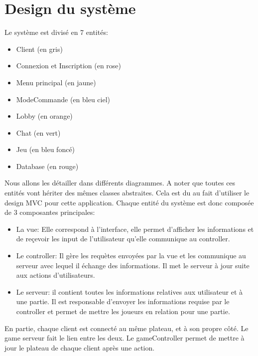 \documentclass[../design_fonctionnement_sys.tex]{subfiles}
\begin{document}
\section{Design du système}
Le système est divisé en 7 entités:
\begin{itemize}
    \item Client (en gris)
    \item Connexion et Inscription (en rose)
    \item Menu principal (en jaune)
    \item ModeCommande (en bleu ciel)
    \item Lobby (en orange)
    \item Chat (en vert)
    \item Jeu (en bleu foncé)
    \item Database (en rouge)
    \newline
\end{itemize}

Nous allons les détailler dans différents diagrammes. A noter que toutes ces entités vont hériter des mêmes classes abstraites.
Cela est du au fait d'utiliser le design MVC pour cette application.
Chaque entité du système est donc composée de 3 composantes principales:
\begin{itemize}
    \item La vue: Elle correspond à l'interface, elle permet d'afficher les informations 
    et de reçevoir les input de l'utilisateur qu'elle communique au controller.
    \item Le controller: Il gère les requètes envoyées par la vue et les communique au serveur avec lequel il échange des informations.
    Il met le serveur à jour suite aux actions d'utilisateurs.
    \item Le serveur: il contient toutes les informations relatives aux utilisateur et à une partie. 
    Il est responsable d'envoyer les informations requise par le controller et permet de mettre les joueurs en relation pour une partie.\\
\end{itemize}

En partie, chaque client est connecté au même plateau, et à son propre côté. Le game serveur fait le lien entre les deux.
Le gameController permet de mettre à jour le plateau de chaque client après une action.

\newpage
\end{document}
